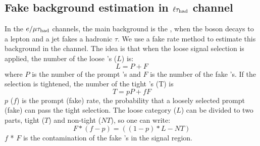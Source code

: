 \subsection{\texorpdfstring{Fake background estimation in $\ell\tau_{\rm had}$ channel}{Fake background estimation in lepton-tau channel}}
\label{sect:bkgFake}
In the $e/\mu\tau_{\rm had}$ channels, the main background is the \wjets, when the \Wpm boson decays to a lepton and a jet fakes a hadronic $\tau$.
We use a fake rate method to estimate this background \cite{CMS_AN_2010-261} in the \muTau channel.
The idea is that when the loose signal selection is applied, the number of the loose \Tau's ($L$) is:
\begin{equation}
L = P + F
\end{equation}
where $P$ is the number of the  prompt \Tau's and $F$ is the number of the  fake \Tau's. If the selection is tightened, the number of the tight \Tau's (T) is
\begin{equation}
 T = pP + fF
\end{equation} 
$p$ ($f$) is the prompt (fake) rate, the probability that a loosely selected prompt (fake) \Tau can pass the  tight  selection. The loose category ($L$) can be divided to two parts, 
tight ($T$) and non-tight ($NT$), so one can write:
\begin{equation}
   F * (f - p) = ((1 - p) * L - NT)
\label{eq:F}
\end{equation}
$f$ * $F$ is the contamination of the fake \Tau's in the signal region. 

